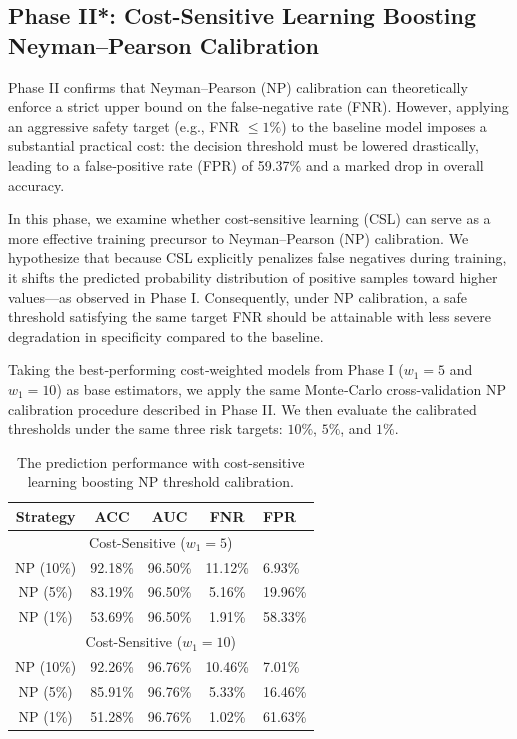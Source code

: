 \documentclass[sigconf,review,anonymous]{acmart}
\theoremstyle{remark}
\begin{document}
\subsection{Phase II*: Cost-Sensitive Learning Boosting Neyman–Pearson Calibration}

Phase II confirms that Neyman–Pearson (NP) calibration can theoretically enforce a strict upper bound on the false‑negative rate (FNR). However, applying an aggressive safety target (e.g., FNR $\leq 1\%$) to the baseline model imposes a substantial practical cost: the decision threshold must be lowered drastically, leading to a false‑positive rate (FPR) of 59.37\% and a marked drop in overall accuracy.

In this phase, we examine whether cost‑sensitive learning (CSL) can serve as a more effective training precursor to Neyman–Pearson (NP) calibration. We hypothesize that because CSL explicitly penalizes false negatives during training, it shifts the predicted probability distribution of positive samples toward higher values—as observed in Phase I. Consequently, under NP calibration, a safe threshold satisfying the same target FNR should be attainable with less severe degradation in specificity compared to the baseline.

Taking the best‑performing cost‑weighted models from Phase I (\(w_{1}=5\) and \(w_{1}=10\)) as base estimators, we apply the same Monte‑Carlo cross‑validation NP calibration procedure described in Phase II. We then evaluate the calibrated thresholds under the same three risk targets: \(10\%\), \(5\%\), and \(1\%\).


\begin{table}[htbp]
    \centering
    \caption{The prediction performance with cost-sensitive learning boosting NP threshold calibration.}
    \label{tab:csl_np_results}
    \begin{tabular}{ccccl}
        \toprule
        Strategy & ACC & AUC & FNR & FPR \\
        \midrule
        \multicolumn{5}{c}{Cost-Sensitive ($w_1=5$)} \\
        \midrule
         NP (10\%) & 92.18\% & 96.50\% & 11.12\% & 6.93\% \\
         NP (5\%)  & 83.19\% & 96.50\% & 5.16\%  & 19.96\% \\
         NP (1\%)  & 53.69\% & 96.50\% & 1.91\%  & 58.33\% \\
        \midrule
        \multicolumn{5}{c}{Cost-Sensitive ($w_1=10$)} \\
        \midrule
         NP (10\%) & 92.26\% & 96.76\% & 10.46\% & 7.01\% \\
         NP (5\%)  & 85.91\% & 96.76\% & 5.33\%  & 16.46\% \\
         NP (1\%)  & 51.28\% & 96.76\% & 1.02\%  & 61.63\% \\
        \bottomrule
    \end{tabular}
    \vskip -0.1in
\end{table}
\end{document}
